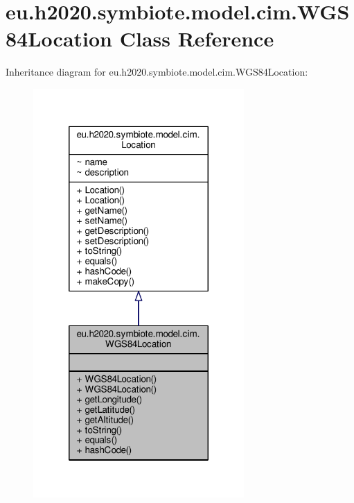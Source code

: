 \hypertarget{classeu_1_1h2020_1_1symbiote_1_1model_1_1cim_1_1WGS84Location}{}\section{eu.\+h2020.\+symbiote.\+model.\+cim.\+W\+G\+S84\+Location Class Reference}
\label{classeu_1_1h2020_1_1symbiote_1_1model_1_1cim_1_1WGS84Location}


Inheritance diagram for eu.\+h2020.\+symbiote.\+model.\+cim.\+W\+G\+S84\+Location\+:\nopagebreak
\begin{figure}[H]
\begin{center}
\leavevmode
\includegraphics[width=228pt]{classeu_1_1h2020_1_1symbiote_1_1model_1_1cim_1_1WGS84Location__inherit__graph}
\end{center}
\end{figure}


